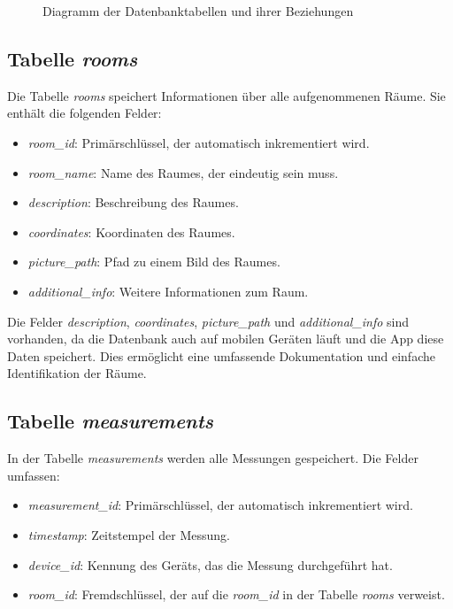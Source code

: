 \begin{figure}
    \caption{Diagramm der Datenbanktabellen und ihrer Beziehungen}
    \label{fig:database-diagram}
\end{figure}


\subsection{Tabelle \textit{rooms}}

Die Tabelle \textit{rooms} speichert Informationen über alle aufgenommenen Räume. Sie enthält die folgenden Felder:
\begin{itemize}
    \item \textit{room\_id}: Primärschlüssel, der automatisch inkrementiert wird.
    \item \textit{room\_name}: Name des Raumes, der eindeutig sein muss.
    \item \textit{description}: Beschreibung des Raumes.
    \item \textit{coordinates}: Koordinaten des Raumes.
    \item \textit{picture\_path}: Pfad zu einem Bild des Raumes.
    \item \textit{additional\_info}: Weitere Informationen zum Raum.
\end{itemize}

Die Felder \textit{description}, \textit{coordinates}, \textit{picture\_path} und \textit{additional\_info} sind vorhanden, da die Datenbank auch auf mobilen Geräten läuft und die App diese Daten speichert. Dies ermöglicht eine umfassende Dokumentation und einfache Identifikation der Räume.

\subsection{Tabelle \textit{measurements}}

In der Tabelle \textit{measurements} werden alle Messungen gespeichert. Die Felder umfassen:
\begin{itemize}
    \item \textit{measurement\_id}: Primärschlüssel, der automatisch inkrementiert wird.
    \item \textit{timestamp}: Zeitstempel der Messung.
    \item \textit{device\_id}: Kennung des Geräts, das die Messung durchgeführt hat.
    \item \textit{room\_id}: Fremdschlüssel, der auf die \textit{room\_id} in der Tabelle \textit{rooms} verweist.
\end{itemize}

